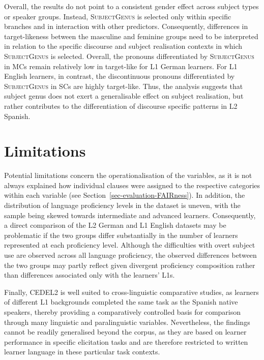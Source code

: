 \documentclass[
  letterpaper,
  DIV=11,
  numbers=noendperiod]{scrartcl}
\begin{document}
Overall, the results do not point to a consistent gender effect across
subject types or speaker groups. Instead, \textsc{SubjectGenus} is
selected only within specific branches and in interaction with other
predictors. Consequently, differences in target-likeness between the
masculine and feminine groups need to be interpreted in relation to the
specific discourse and subject realisation contexts in which
\textsc{SubjectGenus} is selected. Overall, the pronouns differentiated
by \textsc{SubjectGenus} in MCs remain relatively low in target-like for
L1 German learners. For L1 English learners, in contrast, the
discontinuous pronouns differentiated by \textsc{SubjectGenus} in SCs
are highly target-like. Thus, the analysis suggests that subject genus
does not exert a generalisable effect on subject realisation, but rather
contributes to the differentiation of discourse specific patterns in L2
Spanish.

\section{Limitations}\label{sec-Limitations}

Potential limitations concern the operationalisation of the variables,
as it is not always explained how individual clauses were assigned to
the respective categories within each variable (see
Section~\ref{sec-evaluation-FAIRness}). In addition, the distribution of
language proficiency levels in the dataset is uneven, with the sample
being skewed towards intermediate and advanced learners. Consequently, a
direct comparison of the L2 German and L1 English datasets may be
problematic if the two groups differ substantially in the number of
learners represented at each proficiency level. Although the
difficulties with overt subject use are observed across all language
proficiency, the observed differences between the two groups may partly
reflect given divergent proficiency composition rather than differences
associated only with the learners' L1s.

Finally, CEDEL2 is well suited to cross-linguistic comparative studies,
as learners of different L1 backgrounds completed the same task as the
Spanish native speakers, thereby providing a comparatively controlled
basis for comparison through many linguistic and paralinguistic
variables. Nevertheless, the findings cannot be readily generalised
beyond the corpus, as they are based on learner performance in specific
elicitation tasks and are therefore restricted to written learner
language in these particular task contexts.
\end{document}
